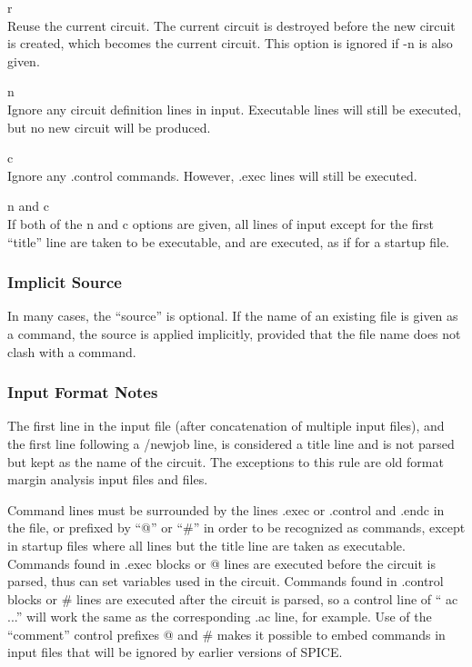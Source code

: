 \begin{description}
\item{\vt r}\\
Reuse the current circuit.  The current circuit is destroyed before
the new circuit is created, which becomes the current circuit.  This
option is ignored if {\vt -n} is also given.

\item{\vt n}\\
Ignore any circuit definition lines in input.  Executable lines will
still be executed, but no new circuit will be produced.

\item{\vt c}\\
Ignore any {\vt .control} commands.  However, {\vt .exec} lines will
still be executed.

\item{{\vt n} and {\vt c}}\\
If both of the {\vt n} and {\vt c} options are given, all lines of
input except for the first ``title'' line are taken to be executable,
and are executed, as if for a startup file.
\end{description}

\subsubsection{Implicit Source}

In many cases, the ``{\vt source}'' is optional.  If the name of an
existing file is given as a command, the {\cb source} is applied
implicitly, provided that the file name does not clash with a
{\WRspice} command.

\subsubsection{Input Format Notes}

The first line in the input file (after concatenation of multiple
input files), and the first line following a {\vt /newjob} line, is
considered a title line and is not parsed but kept as the name of the
circuit.  The exceptions to this rule are old format margin analysis
input files and {\Xic} files.

Command lines must be surrounded by the lines {\vt .exec} or {\vt
.control} and {\vt .endc} in the file, or prefixed by ``{\vt *@}'' or
``{\vt *\#}'' in order to be recognized as commands, except in startup
files where all lines but the title line are taken as executable. 
Commands found in {\vt .exec} blocks or {\vt *@} lines are executed
before the circuit is parsed, thus can set variables used in the
circuit.  Commands found in {\vt .control} blocks or {\vt *\#} lines
are executed after the circuit is parsed, so a control line of ``{\vt
ac ...}'' will work the same as the corresponding {\vt .ac} line, for
example.  Use of the ``comment'' control prefixes {\vt *@} and {\vt *\#}
makes it possible to embed commands in {\WRspice} input files
that will be ignored by earlier versions of SPICE.

